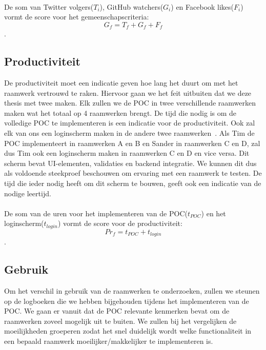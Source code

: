\paragraph{}
De som van Twitter volgers($T_i$), GitHub watchers($G_i$) en Facebook likes($F_i$) vormt de score voor het gemeenschapscriteria:
\begin{equation}
  G_f={T_f+G_f+F_f}
  \label{eq:gemeenschap}
\end{equation}.

\subsection{Productiviteit}
\label{sec:vergelijking-gemeenschap}
De productiviteit moet een indicatie geven hoe lang het duurt om met het raamwerk vertrouwd te raken. 
Hiervoor gaan we het feit uitbuiten dat we deze thesis met twee maken. 
Elk zullen we de POC in twee verschillende raamwerken maken wat het totaal op 4 raamwerken brengt. 
De tijd die nodig is om de volledige POC te implementeren is een indicatie voor de productiviteit. 
Ook zal elk van ons een loginscherm maken in de andere twee raamwerken~\cite{Burris}. 
Als Tim de POC implementeert in raamwerken A en B en Sander in raamwerken C en D, zal dus Tim ook een loginscherm maken in raamwerken C en D en vice versa.  
Dit scherm bevat UI-elementen, validaties en backend integratie. 
We kunnen dit dus als voldoende steekproef beschouwen om ervaring met een raamwerk te testen. 
De tijd die ieder nodig heeft om dit scherm te bouwen, geeft ook een indicatie van de nodige leertijd.
\paragraph{}
De som van de uren voor het implementeren van de POC($t_{POC}$) en het loginscherm($t_{login}$) vormt de score voor de productiviteit:
\begin{equation}
  Pr_f = {t_{POC} + t_{login}}
  \label{eq:productiviteit}
\end{equation}.

\subsection{Gebruik}
\label{sec:vergelijking-gemeenschap}
Om het verschil in gebruik van de raamwerken te onderzoeken, zullen we steunen op de logboeken die we hebben bijgehouden tijdens het implementeren van de POC. 
We gaan er vanuit dat de POC relevante kenmerken bevat om de raamwerken zoveel mogelijk uit te buiten. 
We zullen bij het vergelijken de moeilijkheden groeperen zodat het snel duidelijk wordt welke functionaliteit in een bepaald raamwerk moeilijker/makkelijker te implementeren is. 

